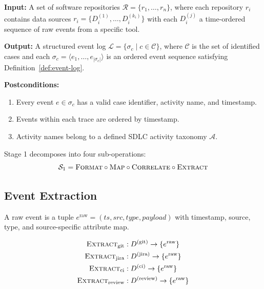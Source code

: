 \begin{definition}
\label{def:contract-s1}
\textbf{Input:} A set of software repositories
$\mathcal{R} = \{r_1, \ldots, r_n\}$, where each repository $r_i$ contains
data sources $r_i = \{D_i^{(1)}, \ldots, D_i^{(k_i)}\}$ with each
$D_i^{(j)}$ a time-ordered sequence of raw events from a specific tool.

\textbf{Output:} A structured event log
$\mathcal{L} = \{\sigma_c \mid c \in \mathcal{C}\}$, where $\mathcal{C}$
is the set of identified cases and each
$\sigma_c = \langle e_1, \ldots, e_{|\sigma_c|} \rangle$ is an ordered
event sequence satisfying Definition~\ref{def:event-log}.

\textbf{Postconditions:}
\begin{enumerate}
    \item Every event $e \in \sigma_c$ has a valid case identifier,
    activity name, and timestamp.
    \item Events within each trace are ordered by timestamp.
    \item Activity names belong to a defined SDLC activity taxonomy
    $\mathcal{A}$.
\end{enumerate}
\end{definition}

Stage 1 decomposes into four sub-operations:
\begin{equation}
\label{eq:s1-decomposition}
\mathcal{S}_1 = \textsc{Format} \circ \textsc{Map} \circ \textsc{Correlate} \circ \textsc{Extract}
\end{equation}


\subsection{Event Extraction}
\label{sec:s1-extraction}

\begin{definition}
\label{def:raw-event}
A raw event is a tuple $e^{\text{raw}} = (ts, src, type, payload)$ with
timestamp, source, type, and source-specific attribute map.
\end{definition}

\begin{definition}
\label{def:extractors}
\begin{align}
\textsc{Extract}_{\text{git}}    &: D^{(\text{git})} \to \{e^{\text{raw}}\}  \\
\textsc{Extract}_{\text{jira}}   &: D^{(\text{jira})} \to \{e^{\text{raw}}\} \\
\textsc{Extract}_{\text{ci}}     &: D^{(\text{ci})} \to \{e^{\text{raw}}\}   \\
\textsc{Extract}_{\text{review}} &: D^{(\text{review})} \to \{e^{\text{raw}}\}
\end{align}
\end{definition}

